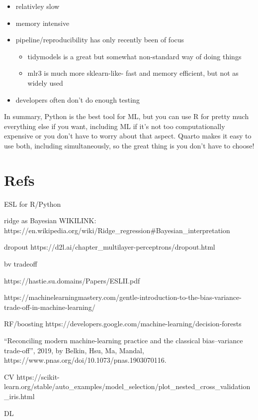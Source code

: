 \documentclass[
  letterpaper,
]{krantz}
\providecommand{\tightlist}{%
  \setlength{\itemsep}{0pt}\setlength{\parskip}{0pt}}\usepackage{longtable,booktabs,array}
\begin{document}
\begin{itemize}
\tightlist
\item
  relativley slow
\item
  memory intensive
\item
  pipeline/reproducibility has only recently been of focus

  \begin{itemize}
  \tightlist
  \item
    tidymodels is a great but somewhat non-standard way of doing things
  \item
    mlr3 is much more sklearn-like- fast and memory efficient, but not
    as widely used
  \end{itemize}
\item
  developers often don't do enough testing
\end{itemize}

In summary, Python is the best tool for ML, but you can use R for pretty
much everything else if you want, including ML if it's not too
computationally expensive or you don't have to worry about that aspect.
Quarto makes it easy to use both, including simultaneously, so the great
thing is you don't have to choose!

\section{Refs}\label{refs-1}

ESL for R/Python

ridge as Bayesian WIKILINK:
https://en.wikipedia.org/wiki/Ridge\_regression\#Bayesian\_interpretation

dropout https://d2l.ai/chapter\_multilayer-perceptrons/dropout.html

bv tradeoff

https://hastie.su.domains/Papers/ESLII.pdf

https://machinelearningmastery.com/gentle-introduction-to-the-bias-variance-trade-off-in-machine-learning/

RF/boosting
https://developers.google.com/machine-learning/decision-forests

``Reconciling modern machine-learning practice and the classical
bias--variance trade-off'', 2019, by Belkin, Hsu, Ma, Mandal,
https://www.pnas.org/doi/10.1073/pnas.1903070116.

CV
https://scikit-learn.org/stable/auto\_examples/model\_selection/plot\_nested\_cross\_validation\_iris.html

DL
\end{document}
